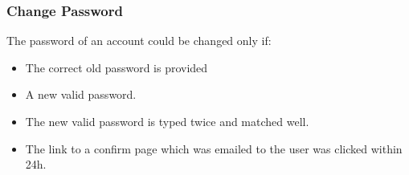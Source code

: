 \subsubsection{Change Password}

The password of an account could be changed only if:

\begin{itemize}
\itemsep1pt\parskip0pt
\item
  The correct old password is provided
\item
  A new valid password.
\item
  The new valid password is typed twice and matched well.
\item
  The link to a confirm page which was emailed to the user was clicked
  within 24h.
\end{itemize}

